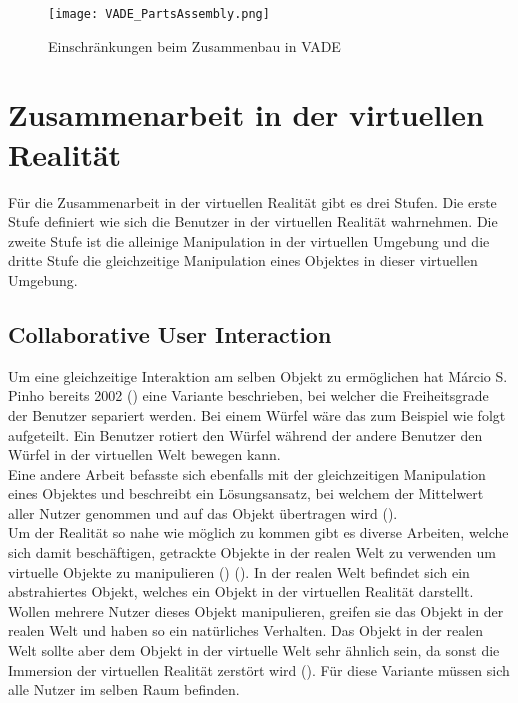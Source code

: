 \begin{figure}[h!]
	\centering
	\texttt{[image: VADE\_PartsAssembly.png]}
	\caption{Einschränkungen beim Zusammenbau in VADE}
	\label{fig:VADEAssembly}
\end{figure} 

\section{Zusammenarbeit in der virtuellen Realität}
Für die Zusammenarbeit in der virtuellen Realität gibt es drei Stufen. Die erste Stufe definiert wie sich die Benutzer in der virtuellen Realität wahrnehmen. Die zweite Stufe ist die alleinige Manipulation in der virtuellen Umgebung und die dritte Stufe die gleichzeitige Manipulation eines Objektes in dieser virtuellen Umgebung. 

\subsection{Collaborative User Interaction}
\label{ch:collaborative_user_interaction}
Um eine gleichzeitige Interaktion am selben Objekt zu ermöglichen hat Márcio S. Pinho bereits 2002 (\cite{pinho_cooperative_2002}) eine Variante beschrieben, bei welcher die Freiheitsgrade der Benutzer separiert werden. Bei einem Würfel wäre das zum Beispiel wie folgt aufgeteilt. Ein Benutzer rotiert den Würfel während der andere Benutzer den Würfel in der virtuellen Welt bewegen kann. \\
 
\noindent Eine andere Arbeit befasste sich ebenfalls mit der gleichzeitigen Manipulation eines Objektes und beschreibt ein Lösungsansatz, bei welchem der Mittelwert aller Nutzer genommen und auf das Objekt übertragen wird (\cite{ruddle_symmetric_2002}). \\
 
\noindent Um der Realität so nahe wie möglich zu kommen gibt es diverse Arbeiten, welche sich damit beschäftigen, getrackte Objekte in der realen Welt zu verwenden um virtuelle Objekte zu manipulieren (\cite{he_physhare:_2017}) (\cite{podkosova_immersivedeck:_2016}). In der realen Welt befindet sich ein abstrahiertes Objekt, welches ein Objekt in der virtuellen Realität darstellt. Wollen mehrere Nutzer dieses Objekt manipulieren, greifen sie das Objekt in der realen Welt und haben so ein natürliches Verhalten. Das Objekt in der realen Welt sollte aber dem Objekt in der virtuelle Welt sehr ähnlich sein, da sonst die Immersion der virtuellen Realität zerstört wird (\cite{simeone_substitutional_2015}). Für diese Variante müssen sich alle Nutzer im selben Raum befinden.
\pagebreak
